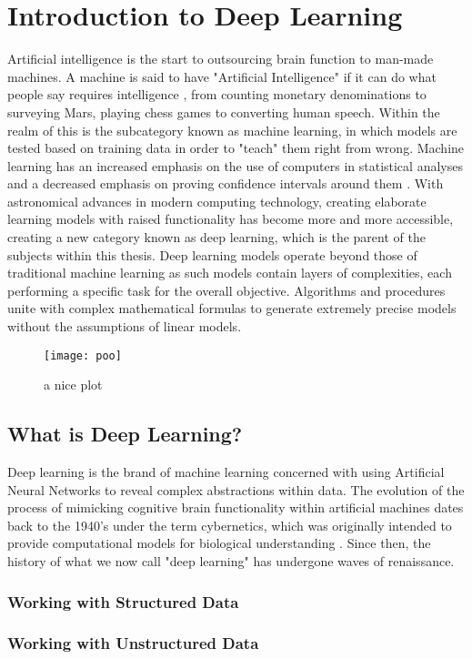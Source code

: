 \chapter{Introduction to Deep Learning}

Artificial intelligence is the start to outsourcing brain function to man-made machines.  A machine is said to have "Artificial Intelligence" if it can do what people say requires intelligence \cite{jackson2019introduction}, from counting monetary denominations to surveying Mars, playing chess games to converting human speech.  Within the realm of this is the subcategory known as machine learning, in which models are tested based on training data in order to "teach" them right from wrong.  Machine learning has an increased emphasis on the use of computers in statistical analyses and a decreased emphasis on proving confidence intervals around them \cite{Goodfellow-et-al-2016}.  With astronomical advances in modern computing technology, creating elaborate learning models with raised functionality has become more and more accessible, creating a new category known as deep learning, which is the parent of the subjects within this thesis.  Deep learning models operate beyond those of traditional machine learning as such models contain layers of complexities, each performing a specific task for the overall objective.  Algorithms and procedures unite with complex mathematical formulas to generate extremely precise models without the assumptions of linear models.

\begin{figure}[h]
    \centering
    \texttt{[image: poo]}
    \caption{a nice plot}
    \label{fig:mesh1}
\end{figure}

\section{What is Deep Learning?} %

Deep learning is the brand of machine learning concerned with using Artificial Neural Networks to reveal complex abstractions within data.
The evolution of the process of mimicking cognitive brain functionality within artificial machines dates back to the 1940's under the term cybernetics, which was originally intended to provide computational models for biological understanding \cite{Goodfellow-et-al-2016}.  Since then, the history of what we now call "deep learning" has undergone waves of renaissance.

\subsection{Working with Structured Data} %

\subsection{Working with Unstructured Data} %
